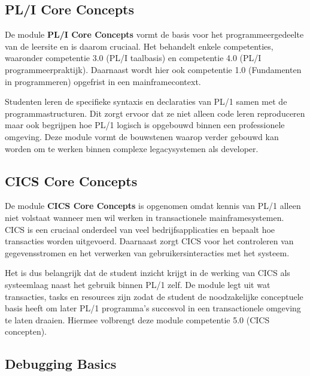 \subsection{PL/I Core Concepts}%
\label{sec:core-pl1}

De module \textbf{PL/I Core Concepts} vormt de basis voor het programmeergedeelte van de leersite en is daarom cruciaal.
Het behandelt enkele competenties, waaronder competentie 3.0 (PL/I taalbasis) en competentie 4.0 (PL/I programmeerpraktijk).
Daarnaast wordt hier ook competentie 1.0 (Fundamenten in programmeren) opgefrist in een mainframecontext.

Studenten leren de specifieke syntaxis en declaraties van PL/1 samen met de programmastructuren.
Dit zorgt ervoor dat ze niet alleen code leren reproduceren maar ook begrijpen hoe PL/1 logisch is opgebouwd binnen een professionele omgeving.
Deze module vormt de bouwstenen waarop verder gebouwd kan worden om te werken binnen complexe legacysystemen als developer.


\subsection{CICS Core Concepts}%
\label{sec:core-cics}

De module \textbf{CICS Core Concepts} is opgenomen omdat kennis van PL/1 alleen niet volstaat wanneer men wil werken in transactionele mainframesystemen.
CICS is een cruciaal onderdeel van veel bedrijfsapplicaties en bepaalt hoe transacties worden uitgevoerd.
Daarnaast zorgt CICS voor het controleren van gegevensstromen en het verwerken van gebruikersinteracties met het systeem.

Het is dus belangrijk dat de student inzicht krijgt in de werking van CICS als systeemlaag naast het gebruik binnen PL/1 zelf.
De module legt uit wat transacties, tasks en resources zijn zodat de student de noodzakelijke conceptuele basis heeft om later PL/1 programma’s succesvol in een transactionele omgeving te laten draaien.
Hiermee volbrengt deze module competentie 5.0 (CICS concepten).


\subsection{Debugging Basics}%
\label{sec:debug-pl1cics}

